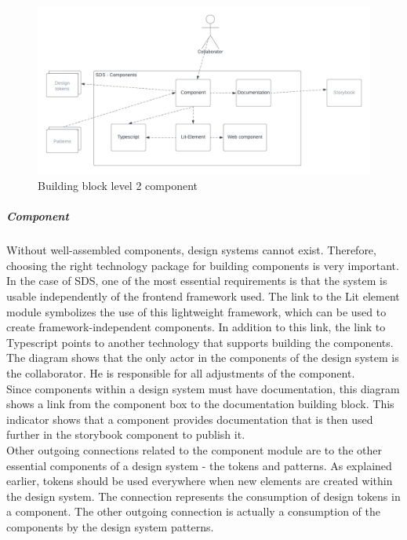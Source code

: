 \begin{figure}[htbp]
    \centerline{
    \includegraphics[width=\linewidth]{images/building_block_view_level_2_component.png}}
\caption{Building block level 2 component}
\label{building_block_level_2_component_sds}
\end{figure}
\subparagraph{Component} \label{sds-component}
Without well-assembled components, design systems cannot exist. Therefore, choosing the right technology package for building components is very important. In the case of \ac{SDS}, one of the most essential requirements is that the system is usable independently of the frontend framework used. The link to the Lit element module symbolizes the use of this lightweight framework, which can be used to create framework-independent components. In addition to this link, the link to Typescript points to another technology that supports building the components.  \\
The diagram shows that the only actor in the components of the design system is the collaborator. He is responsible for all adjustments of the component. \\
Since components within a design system must have documentation, this diagram shows a link from the component box to the documentation building block. This indicator shows that a component provides documentation that is then used further in the storybook component to publish it. \\
Other outgoing connections related to the component module are to the other essential components of a design system - the tokens and patterns. As explained earlier, tokens should be used everywhere when new elements are created within the design system. The connection represents the consumption of design tokens in a component. The other outgoing connection is actually a consumption of the components by the design system patterns. \\

